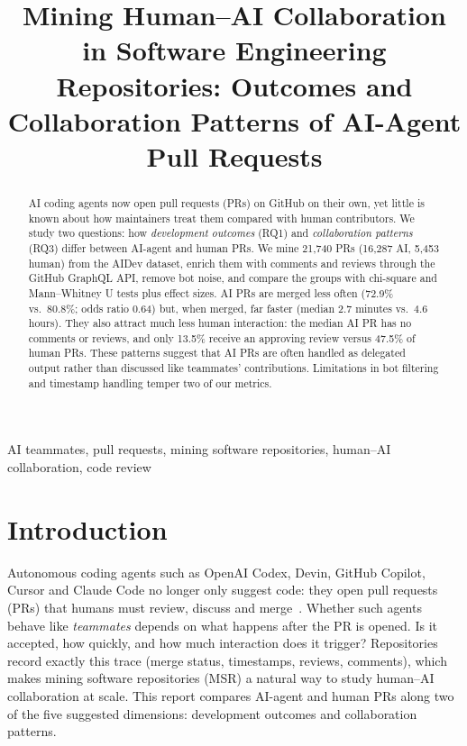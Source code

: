 \documentclass[conference]{IEEEtran}
\begin{document}
\title{Mining Human--AI Collaboration in Software Engineering Repositories: Outcomes and Collaboration Patterns of AI-Agent Pull Requests}

\author{
\and
{}
}

\maketitle

\begin{abstract}
AI coding agents now open pull requests (PRs) on GitHub on their own, yet little is known about how maintainers treat them compared with human contributors. We study two questions: how \emph{development outcomes} (RQ1) and \emph{collaboration patterns} (RQ3) differ between AI-agent and human PRs. We mine 21{,}740 PRs (16{,}287 AI, 5{,}453 human) from the AIDev dataset, enrich them with comments and reviews through the GitHub GraphQL API, remove bot noise, and compare the groups with chi-square and Mann--Whitney U tests plus effect sizes. AI PRs are merged less often (72.9\% vs.\ 80.8\%; odds ratio 0.64) but, when merged, far faster (median 2.7 minutes vs.\ 4.6 hours). They also attract much less human interaction: the median AI PR has no comments or reviews, and only 13.5\% receive an approving review versus 47.5\% of human PRs. These patterns suggest that AI PRs are often handled as delegated output rather than discussed like teammates' contributions. Limitations in bot filtering and timestamp handling temper two of our metrics.
\end{abstract}

\begin{IEEEkeywords}
AI teammates, pull requests, mining software repositories, human--AI collaboration, code review
\end{IEEEkeywords}

\section{Introduction}
Autonomous coding agents such as OpenAI Codex, Devin, GitHub Copilot, Cursor and Claude Code no longer only suggest code: they open pull requests (PRs) that humans must review, discuss and merge~\cite{li2025rise}. Whether such agents behave like \emph{teammates} depends on what happens after the PR is opened. Is it accepted, how quickly, and how much interaction does it trigger? Repositories record exactly this trace (merge status, timestamps, reviews, comments), which makes mining software repositories (MSR) a natural way to study human--AI collaboration at scale. This report compares AI-agent and human PRs along two of the five suggested dimensions: development outcomes and collaboration patterns.
\end{document}
